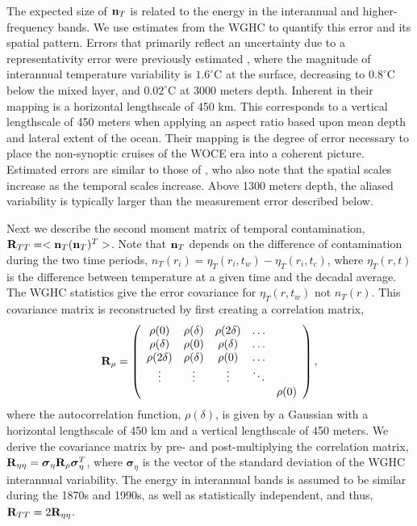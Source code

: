 \documentclass[12pt]{article}
\begin{document}
The expected size of ${\bf n}_T$ is related to the energy in the
interannual and higher-frequency bands. We use estimates from the WGHC
to quantify this error and its spatial pattern.  Errors that primarily
reflect an uncertainty due to a representativity error were
previously estimated \cite{Gouretski-Koltermann-2004:WOCE}, where the
magnitude of interannual temperature variability is $1.6^{\circ}$C at
the surface, decreasing to $0.8^{\circ}$C below the mixed layer, and
$0.02^{\circ}$C at 3000 meters depth. Inherent in their mapping is a
horizontal lengthscale of 450 km. This corresponds to a vertical
lengthscale of 450 meters when applying an aspect ratio based upon
mean depth and lateral extent of the ocean. Their mapping is the
degree of error necessary to place the non-synoptic cruises of the
WOCE era into a coherent picture. Estimated errors are similar to
those of \cite{Wortham-Wunsch-2014:multidimensional}, who also note
that the spatial scales increase as the temporal scales
increase. Above 1300 meters depth, the aliased variability is
typically larger than the measurement error described below.

Next we describe the second moment matrix of temporal contamination,
${\bf R}_{TT} =<{\bf n}_T ({\bf n}_T)^T>$. Note that ${\bf n}_T$
depends on the difference of contamination during the two time
periods, $n_T(r_i) = \eta_T(r_i,t_w) - \eta_T(r_i,t_c)$, where
$\eta_T(r,t)$ is the difference between temperature at a given time
and the decadal average. The WGHC statistics give the error covariance
for $\eta_T(r,t_w)$ not $n_T(r)$. This covariance matrix is
reconstructed by first creating a correlation matrix,
\begin{equation}
  {\bf R}_{\rho} = \left(\begin{array}{ccccc}
\rho(0) & \rho(\delta) & \rho(2\delta) & \hdots & \\
\rho(\delta) & \rho(0) & \rho(\delta) & \hdots &  \\    
\rho(2\delta) & \rho(\delta) & \rho(0) & \hdots &  \\    
\vdots &   \vdots           &  \vdots       &    \ddots & \\
&              &         &     & \rho(0) \end{array} \right),
\end{equation}
where the autocorrelation function, $\rho(\delta)$, is given by a
Gaussian with a horizontal lengthscale of 450 km and a vertical
lengthscale of 450 meters. We derive the covariance matrix by pre- and
post-multiplying the correlation matrix,
${\bf R}_{\eta\eta} = {\boldsymbol \sigma}_\eta {\bf R}_{\rho}
{\boldsymbol \sigma}_\eta^T$,
where ${\boldsymbol \sigma}_\eta$ is the vector of the standard
deviation of the WGHC interannual variability. The energy in
interannual bands is assumed to be similar during the 1870s and 1990s,
as well as statistically independent, and thus,
${\bf R}_{TT} = 2{\bf R}_{\eta\eta}$.
\end{document}
